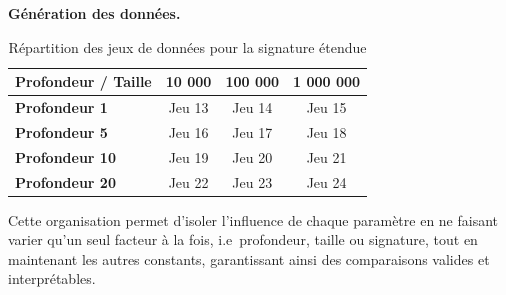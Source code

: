 \documentclass[11pt]{article}
\newenvironment{paraph}[1]{%
  \medskip
  \noindent\textbf{#1.}\quad

  \vspace{0.2cm}
}{%
  \medskip
}
\begin{document}
\begin{paraph}{Génération des données}
    \begin{table}[H]
    \centering
    \begin{tabular}{|l|c|c|c|}
    \hline
    \textbf{Profondeur / Taille} & \textbf{10 000} & \textbf{100 000} 
    & \textbf{1 000 000} \\ \hline
    \textbf{Profondeur 1}        & Jeu 13          & Jeu 14           
    & Jeu 15             \\ \hline
    \textbf{Profondeur 5}        & Jeu 16          & Jeu 17           
    & Jeu 18             \\ \hline
    \textbf{Profondeur 10}       & Jeu 19          & Jeu 20           
    & Jeu 21             \\ \hline
    \textbf{Profondeur 20}       & Jeu 22          & Jeu 23           
    & Jeu 24             \\ \hline
    \end{tabular}
    \caption{Répartition des jeux de données pour la signature étendue}
    \end{table}

    \vspace{0.2cm}
    Cette organisation permet d'isoler l'influence de chaque paramètre 
    en ne faisant varier qu'un seul facteur à la fois, i.e~profondeur, 
    taille ou signature, tout en maintenant les autres constants, 
    garantissant ainsi des comparaisons valides et interprétables.
\end{paraph}
\end{document}
